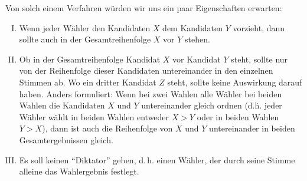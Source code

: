 \documentclass[a4paper,ngerman,12pt]{scrartcl}
\theoremstyle{definition}
\begin{document}
Von solch einem Verfahren würden wir uns ein paar Eigenschaften erwarten:

\begin{enumerate}[(I)]
  \item Wenn jeder Wähler den Kandidaten $X$ dem Kandidaten $Y$ vorzieht, dann sollte auch in der Gesamtreihenfolge $X$ vor $Y$ stehen.
  \item Ob in der Gesamtreihenfolge Kandidat $X$ vor Kandidat $Y$ steht, sollte nur von der Reihenfolge dieser Kandidaten untereinander in den einzelnen Stimmen ab. Wo ein dritter Kandidat $Z$ steht, sollte keine Auswirkung darauf haben. Anders formuliert: Wenn bei zwei Wahlen alle Wähler bei beiden Wahlen die Kandidaten $X$ und $Y$ untereinander gleich ordnen (d.\.h. jeder Wähler wählt in beiden Wahlen entweder $X > Y$ oder in beiden Wahlen $Y > X$), dann ist auch die Reihenfolge von $X$ und $Y$ untereinander in beiden Gesamtergebnissen gleich.
  \item Es soll keinen "`Diktator"' geben, d.\,h. einen Wähler, der durch seine Stimme alleine das Wahlergebnis festlegt.
\end{enumerate}
\end{document}
